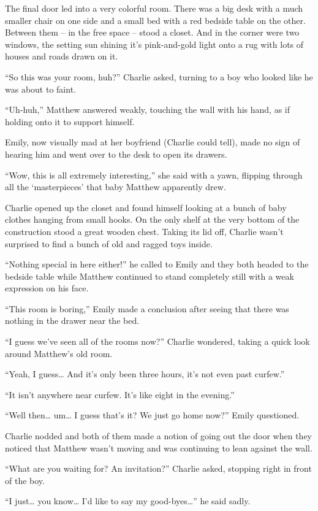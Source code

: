 The final door led into a very colorful room. There was a big desk with a much smaller chair on one side and a small bed with a red bedside table on the other. Between them – in the free space – stood a closet. And in the corner were two windows, the setting sun shining it's pink-and-gold light onto a rug with lots of houses and roads drawn on it.

“So this was your room, huh?” Charlie asked, turning to a boy who looked like he was about to faint.

“Uh-huh,” Matthew answered weakly, touching the wall with his hand, as if holding onto it to support himself.

Emily, now visually mad at her boyfriend (Charlie could tell), made no sign of hearing him and went over to the desk to open its drawers.

“Wow, this is all extremely interesting,” she said with a yawn, flipping through all the ‘masterpieces' that baby Matthew apparently drew.

Charlie opened up the closet and found himself looking at a bunch of baby clothes hanging from small hooks. On the only shelf at the very bottom of the construction stood a great wooden chest. Taking its lid off, Charlie wasn't surprised to find a bunch of old and ragged toys inside.

“Nothing special in here either!” he called to Emily and they both headed to the bedside table while Matthew continued to stand completely still with a weak expression on his face.

“This room is boring,” Emily made a conclusion after seeing that there was nothing in the drawer near the bed.

“I guess we've seen all of the rooms now?” Charlie wondered, taking a quick look around Matthew's old room.

“Yeah, I guess… And it's only been three hours, it's not even past curfew.”

“It isn't anywhere near curfew. It's like eight in the evening.”

“Well then… um… I guess that's it? We just go home now?” Emily questioned.

Charlie nodded and both of them made a notion of going out the door when they noticed that Matthew wasn't moving and was continuing to lean against the wall.

“What are you waiting for? An invitation?” Charlie asked, stopping right in front of the boy.

“I just… you know… I'd like to say my good-byes…” he said sadly.

